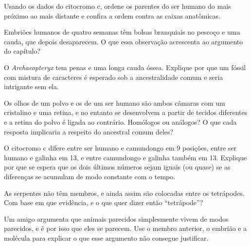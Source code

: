 \begin{exercise}[$\star\star$]\label{exo:g10:common-ancestry:9}
Usando os dados do citocromo c, ordene os parentes do ser humano do
mais próximo ao mais distante e confira a ordem contra as caixas
anatômicas.
\end{exercise}

\begin{exercise}[$\star\star$]\label{exo:g10:common-ancestry:10}
Embriões humanos de quatro semanas têm bolsas branquiais no pescoço e
uma cauda, que depois desaparecem. O que essa observação acrescenta ao
argumento do capítulo?
\end{exercise}

\begin{exercise}[$\star\star$]\label{exo:g10:common-ancestry:11}
O \emph{Archaeopteryx} tem penas e uma longa cauda óssea. Explique por
que um fóssil com mistura de caracteres é esperado sob a
ancestralidade comum e seria intrigante sem ela.
\end{exercise}

\begin{exercise}[$\star\star\star$]\label{exo:g10:common-ancestry:12}
Os olhos de um polvo e os de um ser humano são ambos câmaras com um
cristalino e uma retina, e no entanto se desenvolvem a partir de
tecidos diferentes e a retina do polvo é ligada ao contrário.
Homólogos ou análogos? O que cada resposta implicaria a respeito do
ancestral comum deles?
\end{exercise}

\begin{exercise}[$\star\star\star$]\label{exo:g10:common-ancestry:13}
O citocromo c difere entre ser humano e camundongo em 9 posições, entre
ser humano e galinha em 13, e entre camundongo e galinha também em 13.
Explique por que se espera que os dois últimos números sejam iguais (ou
quase) se as diferenças se acumulam de modo constante com o tempo.
\end{exercise}

\begin{exercise}[$\star\star\star$]\label{exo:g10:common-ancestry:14}
As serpentes não têm membros, e ainda assim são colocadas entre os
tetrápodes. Com base em que evidência, e o que quer dizer então
``tetrápode''?
\end{exercise}

\begin{exercise}[$\star\star\star$]\label{exo:g10:common-ancestry:15}
Um amigo argumenta que animais parecidos simplesmente vivem de modos
parecidos, e é por isso que eles se parecem. Use o membro anterior, o
embrião e a molécula para explicar o que esse argumento não consegue
justificar.
\end{exercise}

